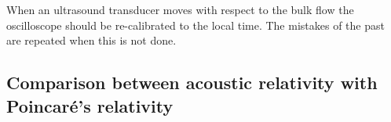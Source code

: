\documentclass[10pt, fleqn,final,showtrims,oldfontcommands]{article} %
\newcommand{\secref}[1]{section~\ref{sec:#1}}
\newcommand{\eqnref}[1]{\ref{eqn:#1}}
\newcommand{\figref}[1]{Figure~\ref{fig:#1}}
\newcommand{\Poincare}{Poincar{\'e}}
\begin{document}
When an ultrasound transducer moves with respect to the bulk flow the oscilloscope should be re-calibrated to the local time.
The mistakes of the past are repeated when this is not done.



\subsection{Comparison between acoustic relativity with \Poincare's relativity}




\end{document}
